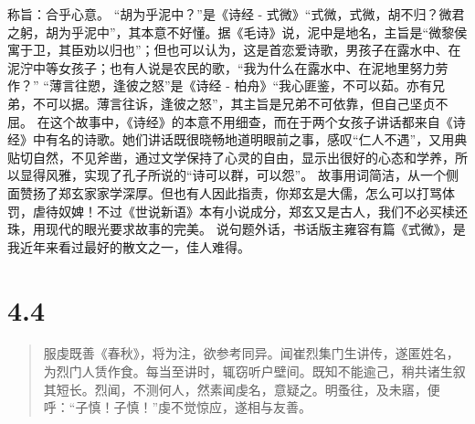 \documentclass[]{book}
\begin{document}
称旨：合乎心意。 ``胡为乎泥中？''是《诗经 -
式微》``式微，式微，胡不归？微君之躬，胡为乎泥中''，其本意不好懂。据《毛诗》说，泥中是地名，主旨是``微黎侯寓于卫，其臣劝以归也''；但也可以认为，这是首恋爱诗歌，男孩子在露水中、在泥泞中等女孩子；也有人说是农民的歌，``我为什么在露水中、在泥地里努力劳作？''
``薄言往愬，逢彼之怒''是《诗经 -
柏舟》``我心匪鉴，不可以茹。亦有兄弟，不可以据。薄言往诉，逢彼之怒''，其主旨是兄弟不可依靠，但自己坚贞不屈。
在这个故事中，《诗经》的本意不用细查，而在于两个女孩子讲话都来自《诗经》中有名的诗歌。她们讲话既很晓畅地道明眼前之事，感叹``仁人不遇''，又用典贴切自然，不见斧凿，通过文学保持了心灵的自由，显示出很好的心态和学养，所以显得风雅，实现了孔子所说的``诗可以群，可以怨''。
故事用词简洁，从一个侧面赞扬了郑玄家家学深厚。但也有人因此指责，你郑玄是大儒，怎么可以打骂体罚，虐待奴婢！不过《世说新语》本有小说成分，郑玄又是古人，我们不必买椟还珠，用现代的眼光要求故事的完美。
说句题外话，书话版主雍容有篇《式微》，是我近年来看过最好的散文之一，佳人难得。

\section{4.4}\label{section-184}

\begin{quote}
服虔既善《春秋》，将为注，欲参考同异。闻崔烈集门生讲传，遂匿姓名，为烈门人赁作食。每当至讲时，辄窃听户壁间。既知不能逾己，稍共诸生叙其短长。烈闻，不测何人，然素闻虔名，意疑之。明蚤往，及未寤，便呼：``子慎！子慎！''虔不觉惊应，遂相与友善。
\end{quote}
\end{document}
